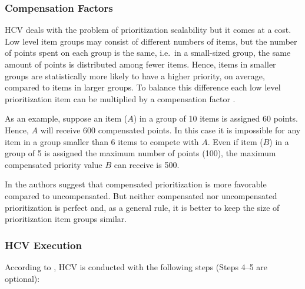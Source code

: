 \subsubsection{Compensation Factors\label{sub:Compensation-factor}}
HCV deals with the problem of prioritization scalability but it comes
at a cost. Low level item groups may consist of different numbers of
items, but the number of points spent on each group is the same, i.e.\ in
a small-sized group, the same amount of points is distributed among fewer items.
Hence, items in smaller groups are statistically more likely to have a higher priority, on 
average, compared to items in larger groups. To balance this difference each low
level prioritization item can be multiplied by a compensation factor \cite{Berander2006a}.

As an example, suppose an item ($A$) in a
group of 10 items is assigned 60 points. Hence, $A$ will receive 600
compensated points. In this case it is impossible for any item in
a group smaller than 6 items to compete with $A$. Even if item ($B$) in
a group of 5 is assigned the maximum number of points (100), the maximum compensated
priority value $B$ can receive is 500.

In \cite{Berander2009a} the authors suggest that compensated prioritization is more favorable
compared to uncompensated. But neither compensated nor uncompensated prioritization
is perfect and, as a general rule, it is better to keep the size of
prioritization item groups similar.

\subsubsection{HCV Execution}
According to \cite{Berander2006a}, HCV is conducted with the following
steps (Steps 4--5 are optional):

